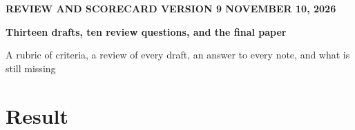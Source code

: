 \documentclass[10pt,letterpaper]{extarticle}
\begin{document}
{\sffamily\scriptsize\color{accent}\textbf{REVIEW AND SCORECARD \;\textperiodcentered\; VERSION 9 \;\textperiodcentered\; NOVEMBER 10, 2026}}\par\vspace{4pt}
{\sffamily\bfseries\fontsize{20}{23}\selectfont Thirteen drafts, ten review questions, and the final paper\par}\vspace{3pt}
{\sffamily\fontsize{11}{14}\selectfont\color{ink2} A rubric of \NCrit{} criteria, a review of every draft, an answer to every note, and what is still missing\par}
\vspace{6pt}

\section*{Result}
\end{document}
